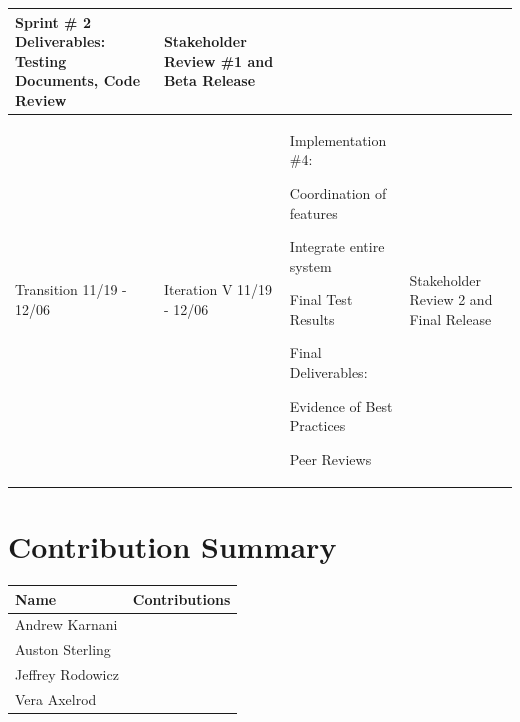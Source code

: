 \documentclass[11pt]{article}
\newenvironment{packed_itemize}{
\begin{itemize}
  \setlength{\itemsep}{1pt}
  \setlength{\parskip}{0pt}
  \setlength{\parsep}{0pt}
}{\end{itemize}}
\begin{document}
\begin{tabular}{|m{0.9in}|m{0.9in}|m{4in}|m{.8in}|}
Sprint \# 2 Deliverables:
 Testing Documents, Code Review &
Stakeholder Review \#1
and
Beta Release \\ \hline
Transition  11/19 - 12/06 &
Iteration V 11/19 - 12/06 & \vspace{0.1in}
Implementation \#4:
	\begin{packed_itemize}
		\vspace{-0.15in}
		\item Coordination of features
		\item Integrate entire system
	\end{packed_itemize}
Final Test Results

Final Deliverables:
	\begin{packed_itemize}
	\vspace{-0.15in}
		\item Evidence of Best Practices
		\item Peer Reviews
	\vspace{-0.15in}
	\end{packed_itemize}
&
Stakeholder Review 2 and Final Release \\
\hline
\end{tabular}


\section{Contribution Summary}

\begin{tabular}{|m{1.4in}|m{4in}|}
\hline
\textbf{\large Name}     & \textbf{\large Contributions} \\
\hline\hline
 Andrew Karnani
	&
	 \begin{packed_itemize}
		\item
	\end{packed_itemize}
\\
\hline
 Auston Sterling
	&
	 \begin{packed_itemize}
	        \item
	\end{packed_itemize}
\\
\hline
Jeffrey Rodowicz
	&
	 \begin{packed_itemize}
		\item
	\end{packed_itemize}
\\
\hline
Vera Axelrod
	&
	 \begin{packed_itemize}
		\item
	\end{packed_itemize}
\\
\hline
\end{tabular}
\end{document}
